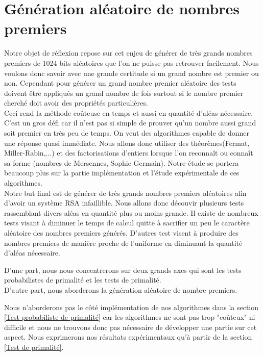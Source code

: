 \section{Génération aléatoire de nombres premiers}

Notre objet de réflexion repose sur cet enjeu de générer de très grands nombres premiers de 1024 bits aléatoires que l'on ne puisse pas retrouver facilement. Nous voulons donc savoir avec une grande certitude si un grand nombre est premier ou non. Cependant pour générer un grand nombre premier aléatoire des tests doivent être appliqués un grand nombre de fois surtout si le nombre premier cherché doit avoir des propriétés particulières.\\
Ceci rend la méthode coûteuse en temps et aussi en quantité d’aléas nécessaire. C'est un gros défi car il n'est pas si simple de prouver qu'un nombre aussi grand soit premier en très peu de temps. On veut des algorithmes capable de donner une réponse quasi immédiate. Nous allons donc utiliser des théorèmes(Fermat, Miller-Rabin,...) et des factorisations d'entiers lorsque l'on reconnaît ou connaît sa forme (nombres de Mersennes, Sophie Germain). Notre étude se portera beaucoup plus sur la partie implémentation et l'étude expérimentale de ces algorithmes.
\\ 
\clearpage
Notre but final est de générer de très grands nombres premiers aléatoires afin d'avoir un système RSA infaillible. Nous allons donc découvir plusieurs tests rassemblant divers aléas en quantité plus ou moins grande.
Il existe de nombreux tests visant à diminuer le temps de calcul quitte à sacrifier un peu le caractère aléatoire des nombres premiers générés. D’autres test visent à produire des nombres premiers de manière proche de l’uniforme en diminuant la quantité d’aléas nécessaire.

D'une part, nous nous concentrerons sur deux grands axes qui sont les tests probabilistes de primalité et les tests de primalité.\\
D'autre part, nous aborderons la génération aléatoire de nombre premiers.

Nous n'aborderons pas le côté implémentation de nos algorithmes dans la section \ref{Test probabiliste de primalité} car les algorithmes ne sont pas trop "coûteux" ni difficile et nous ne trouvons donc pas nécessaire de développer une partie sur cet aspect. Nous exprimerons nos résultats expérimentaux qu'à partir de la section \ref{Test de primalité}.
\clearpage